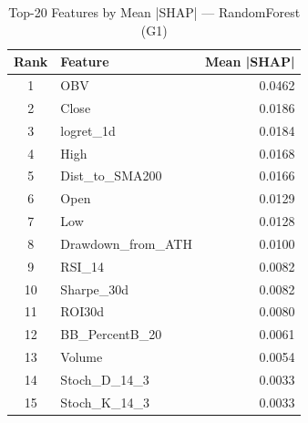 \begin{table}[htbp]
\centering
\caption{Top-20 Features by Mean |SHAP| — RandomForest (G1)}
\label{tab:fi_RandomForest_G1}
\begin{tabular}{clr}
\toprule
Rank & Feature & Mean |SHAP| \\
\midrule
1 & OBV & 0.0462 \\
2 & Close & 0.0186 \\
3 & logret\_1d & 0.0184 \\
4 & High & 0.0168 \\
5 & Dist\_to\_SMA200 & 0.0166 \\
6 & Open & 0.0129 \\
7 & Low & 0.0128 \\
8 & Drawdown\_from\_ATH & 0.0100 \\
9 & RSI\_14 & 0.0082 \\
10 & Sharpe\_30d & 0.0082 \\
11 & ROI30d & 0.0080 \\
12 & BB\_PercentB\_20 & 0.0061 \\
13 & Volume & 0.0054 \\
14 & Stoch\_D\_14\_3 & 0.0033 \\
15 & Stoch\_K\_14\_3 & 0.0033 \\
\bottomrule
\end{tabular}
\end{table}